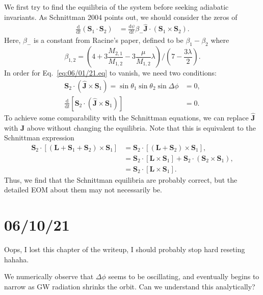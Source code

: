 \documentclass[11pt,
        usenames, %
        dvipsnames %
    ]{article}
\newcommand*{\rd}[2]{\frac{\mathrm{d}#1}{\mathrm{d}#2}}
\newcommand*{\bm}[1]{\boldsymbol{\mathbf{#1}}}
\newcommand*{\uv}[1]{\hat{\bm{#1}}}
\newcommand*{\p}[1]{\left(#1\right)}
\newcommand*{\s}[1]{\left[#1\right]}
\begin{document}
We first try to find the equilibria of the system before seeking adiabatic
invariants. As Schnittman 2004 points out, we should consider the zeros of
\begin{align}
    \rd{}{t}\p{\bm{S}_1 \cdot \bm{S}_2}
        &= \rd{\psi}{t} \beta_- \uv{J} \cdot \p{\bm{S}_1 \times \bm{S}_2}.
        \label{eq:06/01/21.eq}
\end{align}
Here, $\beta_-$ is a constant from Racine's paper, defined to be $\beta_1 -
\beta_2$ where
\begin{equation}
    \beta_{1,2} = \p{4 + 3\frac{M_{2, 1}}{M_{1, 2}}
        - 3\frac{\mu}{M_{1, 2}}\lambda}\Bigg/\p{7 - \frac{3\lambda}{2}}.
\end{equation}
In order for Eq.~\eqref{eq:06/01/21.eq} to vanish, we need two conditions:
\begin{align}
    \bm{S}_2 \cdot \p{\uv{J} \times \bm{S}_1} =
        \sin \theta_1 \sin \theta_2 \sin \Delta \phi &= 0,\\
    \rd{}{t}\s{\bm{S}_2 \cdot \p{\uv{J} \times \bm{S}_1}}
        &= 0.
\end{align}
To achieve some comparability with the Schnittman equations, we can replace
$\uv{J}$ with $\bm{J}$ above without changing the equilibria. Note that this
is equivalent to the Schnittman expression
\begin{align}
    \bm{S}_2 \cdot \s{\p{\bm{L} + \bm{S}_1 + \bm{S}_2} \times \bm{S}_1}
        &= \bm{S}_2 \cdot \s{\p{\bm{L} + \bm{S}_2} \times \bm{S}_1},\\
        &= \bm{S}_2 \cdot \s{\bm{L} \times \bm{S}_1}
            + \bm{S}_2 \cdot \p{\bm{S}_2 \times \bm{S}_1},\\
        &= \bm{S}_2 \cdot \s{\bm{L} \times \bm{S}_1}.
\end{align}
Thus, we find that the Schnittman equilibria are probably correct, but the
detailed EOM about them may not necessarily be.

\section{06/10/21}

Oops, I lost this chapter of the writeup, I should probably stop hard reseting
hahaha.

We numerically observe that $\Delta \phi$ seems to be oscillating, and
eventually begins to narrow as GW radiation shrinks the orbit. Can we understand
this analytically?
\end{document}
